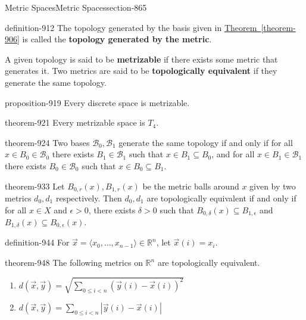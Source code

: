 \documentclass[oneside,10pt,]{article}
\newcommand{\terminology}[1]{\textbf{#1}}
\newcommand{\tuple}[1]{\langle #1 \rangle}
\newcommand{\mb}{\mathbb}
\newcommand{\mc}{\mathcal}
\newcommand{\lt}{<}
\newcommand{\gt}{>}
\begin{document}
\begin{sectionptx}{Metric Spaces}{}{Metric Spaces}{}{}{section-865}
\begin{definition}{}{definition-912}%
\hypertarget{p-913}{}%
The topology generated by the basis given in \hyperref[theorem-906]{Theorem~\ref{theorem-906}} is called the \terminology{topology generated by the metric}.%
\par
\hypertarget{p-916}{}%
A given topology is said to be \terminology{metrizable} if there exists some metric that generates it. Two metrics are said to be \terminology{topologically equivalent} if they generate the same topology.%
\end{definition}
\begin{proposition}{}{}{proposition-919}%
\hypertarget{p-920}{}%
Every discrete space is metrizable.%
\end{proposition}
\begin{theorem}{}{}{theorem-921}%
\hypertarget{p-922}{}%
Every metrizable space is \(T_4\).%
\end{theorem}
\begin{theorem}{}{}{theorem-924}%
\hypertarget{p-925}{}%
Two bases \(\mc B_0,\mc B_1\) generate the same topology if and only if for all \(x\in B_0\in\mc B_0\) there exists \(B_1\in\mc B_1\) such that \(x\in B_1\subseteq B_0\), and for all \(x\in B_1\in\mc B_1\) there exists \(B_0\in\mc B_0\) such that \(x\in B_0\subseteq B_1\). %
\end{theorem}
\begin{theorem}{}{}{theorem-933}%
\hypertarget{p-934}{}%
Let \(B_{0,r}(x),B_{1,r}(x)\) be the metric balls around \(x\) given by two metrics \(d_0,d_1\) respectively. Then \(d_0,d_1\) are topologically equivalent if and only if for all \(x\in X\) and \(\epsilon\gt 0\), there exists \(\delta\gt 0\) such that \(B_{0,\delta}(x)\subseteq B_{1,\epsilon}\) and \(B_{1,\delta}(x)\subseteq B_{0,\epsilon}(x)\).%
\end{theorem}
\begin{definition}{}{definition-944}%
\hypertarget{p-945}{}%
For \(\vec x=\tuple{x_0,\dots,x_{n-1}}\in\mb R^n\), let \(\vec x(i)=x_i\).%
\end{definition}
\begin{theorem}{}{}{theorem-948}%
\hypertarget{p-949}{}%
The following metrics on \(\mb R^n\) are topologically equivalent.%
\leavevmode%
\begin{enumerate}
\item\hypertarget{li-952}{}\(d(\vec x,\vec y)=\sqrt{\sum_{0\leq i\lt n}(\vec y(i)-\vec x(i))^2}\)%
\item\hypertarget{li-954}{}\(d(\vec x,\vec y)=\sum_{0\leq i\lt n}|\vec y(i)-\vec x(i)|\)%

\end{enumerate}
\end{theorem}
\end{sectionptx}
\end{document}
